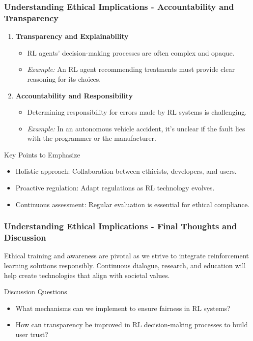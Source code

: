\documentclass{beamer}
\begin{document}
\begin{frame}[fragile]
    \frametitle{Understanding Ethical Implications - Accountability and Transparency}
    \begin{enumerate}[resume]
        \item \textbf{Transparency and Explainability}
            \begin{itemize}
                \item RL agents' decision-making processes are often complex and opaque.
                \item \textit{Example:} An RL agent recommending treatments must provide clear reasoning for its choices.
            \end{itemize}

        \item \textbf{Accountability and Responsibility}
            \begin{itemize}
                \item Determining responsibility for errors made by RL systems is challenging.
                \item \textit{Example:} In an autonomous vehicle accident, it’s unclear if the fault lies with the programmer or the manufacturer.
            \end{itemize}
    \end{enumerate}
    
    \begin{block}{Key Points to Emphasize}
        \begin{itemize}
            \item Holistic approach: Collaboration between ethicists, developers, and users.
            \item Proactive regulation: Adapt regulations as RL technology evolves.
            \item Continuous assessment: Regular evaluation is essential for ethical compliance.
        \end{itemize}
    \end{block}
\end{frame}

\begin{frame}[fragile]
    \frametitle{Understanding Ethical Implications - Final Thoughts and Discussion}
    Ethical training and awareness are pivotal as we strive to integrate reinforcement learning solutions responsibly. Continuous dialogue, research, and education will help create technologies that align with societal values.

    \begin{block}{Discussion Questions}
        \begin{itemize}
            \item What mechanisms can we implement to ensure fairness in RL systems?
            \item How can transparency be improved in RL decision-making processes to build user trust?
        \end{itemize}
    \end{block}
\end{frame}
\end{document}
